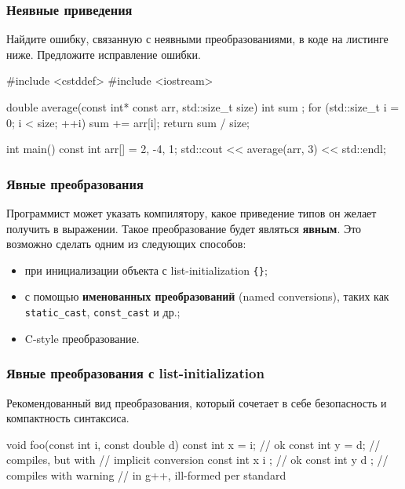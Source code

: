 \documentclass[compress, 8pt, aspectratio=169]{beamer}
\begin{document}
\begin{frame}[fragile]

    \frametitle{Неявные приведения}

    \hfill\break
    \begin{task}
        Найдите ошибку, связанную с неявными преобразованиями, в коде на листинге
        ниже.
        Предложите исправление ошибки.
    \end{task}

    \begin{myinplacelisting}[minted language=cpp]
#include <cstddef>
#include <iostream>

double average(const int* const arr, std::size_t size) {
    int sum {};
    for (std::size_t i = 0; i < size; ++i) {
        sum += arr[i];
    }
    return sum / size;
}

int main() {
    const int arr[] = {2, -4, 1};
    std::cout << average(arr, 3) << std::endl;
}
    \end{myinplacelisting}

\end{frame}

\begin{frame}[fragile]

    \frametitle{Явные преобразования}

    Программист может указать компилятору, какое приведение типов он желает получить
    в выражении.
    Такое преобразование будет являться \textbf{явным}.
    Это возможно сделать одним из следующих способов:

    \begin{itemize}
        \item при инициализации объекта с list-initialization \verb|{}|;
        \item с помощью \textbf{именованных преобразований} (named conversions),
            таких как \verb|static_cast|, \verb|const_cast| и др.;
        \item C-style преобразование.
    \end{itemize}

\end{frame}

\begin{frame}[fragile]

    \frametitle{Явные преобразования с list-initialization}

    Рекомендованный вид преобразования, который сочетает в себе безопасность
    и компактность синтаксиса.

    \begin{myinplacelisting}[minted language=cpp]
void foo(const int i, const double d) {
    {
        const int x = i; // ok
        const int y = d; // compiles, but with
                         // implicit conversion
    }
    {
        const int x { i }; // ok
        const int y { d }; // compiles with warning
                           // in g++, ill-formed per standard
    }
}
    \end{myinplacelisting}

\end{frame}
\end{document}
